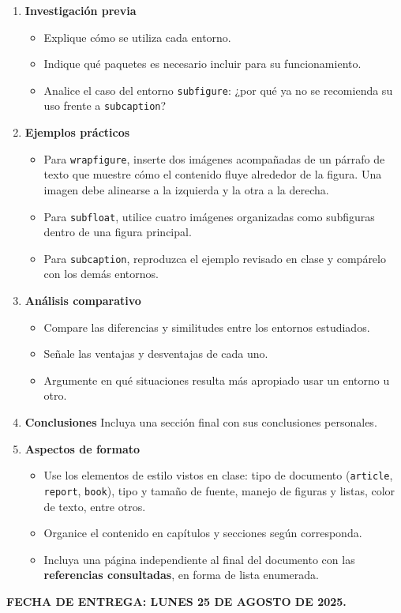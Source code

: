 \documentclass{article}
\begin{document}
\begin{enumerate}
    \item \textbf{Investigación previa}
    \begin{itemize}
        \item Explique cómo se utiliza cada entorno.  
        \item Indique qué paquetes es necesario incluir para su funcionamiento.  
        \item Analice el caso del entorno \texttt{subfigure}: ¿por qué ya no se recomienda su uso frente a \texttt{subcaption}?  
    \end{itemize}
    
    \item \textbf{Ejemplos prácticos}
    \begin{itemize}
        \item Para \texttt{wrapfigure}, inserte dos imágenes acompañadas de un párrafo de texto que muestre cómo el contenido fluye alrededor de la figura. Una imagen debe alinearse a la izquierda y la otra a la derecha.  
        \item Para \texttt{subfloat}, utilice cuatro imágenes organizadas como subfiguras dentro de una figura principal.  
        \item Para \texttt{subcaption}, reproduzca el ejemplo revisado en clase y compárelo con los demás entornos.  
    \end{itemize}
    
    \item \textbf{Análisis comparativo}
    \begin{itemize}
        \item Compare las diferencias y similitudes entre los entornos estudiados.  
        \item Señale las ventajas y desventajas de cada uno.  
        \item Argumente en qué situaciones resulta más apropiado usar un entorno u otro.  
    \end{itemize}
    
    \item \textbf{Conclusiones}  
    Incluya una sección final con sus conclusiones personales.  
    
    \item \textbf{Aspectos de formato}
    \begin{itemize}
        \item Use los elementos de estilo vistos en clase: tipo de documento (\texttt{article}, \texttt{report}, \texttt{book}), tipo y tamaño de fuente, manejo de figuras y listas, color de texto, entre otros.  
        \item Organice el contenido en capítulos y secciones según corresponda.  
        \item Incluya una página independiente al final del documento con las \textbf{referencias consultadas}, en forma de lista enumerada.  
    \end{itemize}
\end{enumerate}

\textbf{FECHA DE ENTREGA: LUNES 25 DE AGOSTO DE 2025.}
\end{document}
